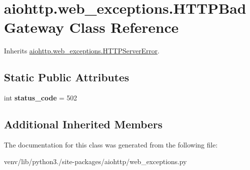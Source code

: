 \hypertarget{classaiohttp_1_1web__exceptions_1_1_h_t_t_p_bad_gateway}{}\section{aiohttp.\+web\+\_\+exceptions.\+H\+T\+T\+P\+Bad\+Gateway Class Reference}
\label{classaiohttp_1_1web__exceptions_1_1_h_t_t_p_bad_gateway}


Inherits \hyperlink{classaiohttp_1_1web__exceptions_1_1_h_t_t_p_server_error}{aiohttp.\+web\+\_\+exceptions.\+H\+T\+T\+P\+Server\+Error}.

\subsection*{Static Public Attributes}
\begin{DoxyCompactItemize}
\item 
\mbox{\label{classaiohttp_1_1web__exceptions_1_1_h_t_t_p_bad_gateway_a23b50a0080f7aaf134dd0c272900b0ab}} 
int {\bfseries status\+\_\+code} = 502
\end{DoxyCompactItemize}
\subsection*{Additional Inherited Members}


The documentation for this class was generated from the following file\+:\begin{DoxyCompactItemize}
\item 
venv/lib/python3./site-\/packages/aiohttp/web\+\_\+exceptions.\+py\end{DoxyCompactItemize}
